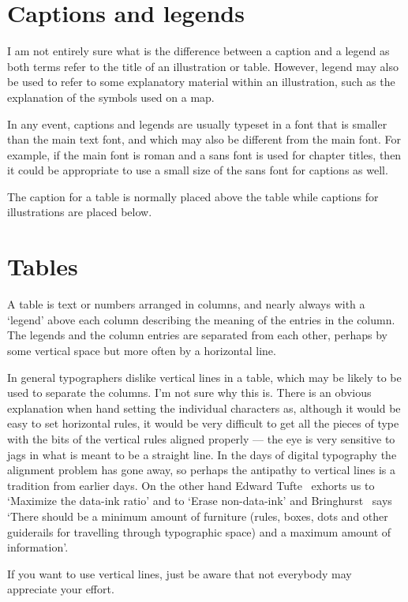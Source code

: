 \documentclass[10pt,a4paper,oneside,extrafontsizes]{memoir}%
\begin{document}
\section{Captions and legends}

\begin{paracol}{2}
\switchEng
    I am not entirely sure what is the difference between a
caption and a legend as both terms refer to the title of an 
illustration or table. 
However, legend may also be used to refer to some explanatory 
material within an illustration, such as the 
explanation of the symbols used on a map.

    In any event, captions and legends are usually typeset in a font that
is smaller than the main text font, and which may also be different from the
main font. For example, if the main font is roman and a sans font is used
for chapter titles, then it could be appropriate to use a small size
of the sans font for captions as well.

    The caption for a table is normally placed above the 
table while captions for illustrations are placed below.
\end{paracol}

\section{Tables}

\begin{paracol}{2}
\switchEng
    A table is text or numbers arranged in columns, 
and nearly always
with a `legend' above each column describing the meaning of
the entries in the column. The legends and the column entries are
separated from each other, perhaps by some vertical space but more often
by a horizontal line.

    In general typographers dislike vertical lines in a table, which may
be likely to be used to separate the columns. I'm not sure why this is.
There is an obvious explanation when hand setting the individual characters
as, although it would be easy to set horizontal rules, it would be very 
difficult to get all the pieces of type with the bits of the vertical rules
aligned properly --- the eye is very sensitive to jags in what is meant to
be a straight line. In the days of digital typography the alignment problem
has gone away, so perhaps the antipathy to vertical lines is a tradition
from earlier days. On the other hand Edward Tufte~\autocite[p. 96]{TUFTE83} 
exhorts us to `Maximize the data-ink ratio' and to `Erase non-data-ink'
and Bringhurst~\autocite[p. 70]{BRINGHURST99} says `There should be a minimum
amount of furniture (rules, boxes, dots and other guiderails for
travelling through typographic space) and a maximum amount
of information'.

    If you want to use vertical lines, just be aware that not everybody
may appreciate your effort.
\end{paracol}
\end{document}
